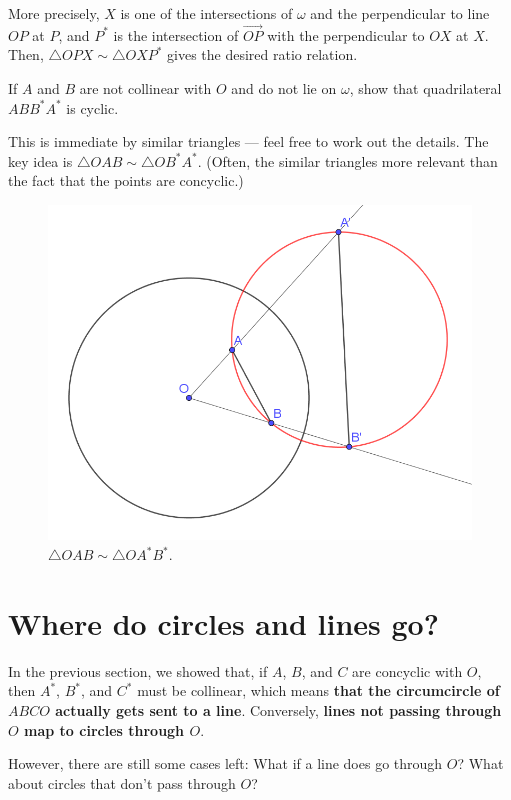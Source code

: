 \documentclass{scrartcl}
\providecommand{\alert}{\textbf}
\begin{document}
More precisely, $X$ is one of the intersections of $\omega$ and
the perpendicular to line $OP$ at $P$, and $P^\ast$ is
the intersection of $\overrightarrow{OP}$ with the perpendicular to
$OX$ at $X$. Then, $\triangle OPX\sim\triangle OXP^\ast$
gives the desired ratio relation.

\pagebreak

\begin{problem}
	If $A$ and $B$ are not collinear with $O$ and do not lie on $\omega$,
	show that quadrilateral $ABB^\ast A^\ast$ is cyclic.
\end{problem}

This is immediate by similar triangles --- feel free to work out the details.
The key idea is $\triangle OAB\sim\triangle OB^\ast A^\ast$.
(Often, the similar triangles more relevant than the fact that
the points are concyclic.)

\begin{figure}[h]
	\centering
	\includegraphics[width=0.7\linewidth]{inversion_cyclic}
	\caption{$\triangle OAB\sim\triangle OA^\ast B^\ast$.}
	\label{fig:inversioncyclic}
\end{figure}

\pagebreak

\section{Where do circles and lines go?}

In the previous section, we showed that,
if $A$, $B$, and $C$ are concyclic with $O$,
then $A^\ast$, $B^\ast $, and $C^\ast $ must be collinear, which means
\alert{that the circumcircle of $ABCO$ actually gets sent to a line}.
Conversely, \alert{lines not passing through $O$ map to circles through $O$}.

However, there are still some cases left: What if a line does go through $O$?
What about circles that don't pass through $O$?
\end{document}
